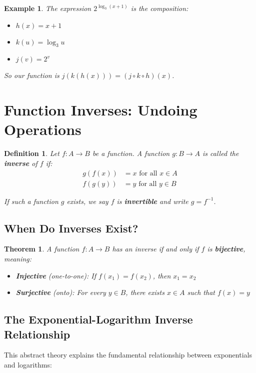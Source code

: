 \documentclass[12pt]{article}
\newtheorem{definition}{Definition}
\newtheorem{theorem}{Theorem}
\newtheorem{example}{Example}
\begin{document}
\begin{example}
The expression $2^{\log_3(x+1)}$ is the composition:
\begin{itemize}
\item $h(x) = x + 1$
\item $k(u) = \log_3 u$  
\item $j(v) = 2^v$
\end{itemize}

So our function is $j(k(h(x))) = (j \circ k \circ h)(x)$.
\end{example}

\section{Function Inverses: Undoing Operations}

\begin{definition}
Let $f: A \to B$ be a function. A function $g: B \to A$ is called the \textbf{inverse} of $f$ if:
\begin{align}
g(f(x)) &= x \text{ for all } x \in A \\
f(g(y)) &= y \text{ for all } y \in B
\end{align}

If such a function $g$ exists, we say $f$ is \textbf{invertible} and write $g = f^{-1}$.
\end{definition}

\subsection{When Do Inverses Exist?}

\begin{theorem}
A function $f: A \to B$ has an inverse if and only if $f$ is \textbf{bijective}, meaning:
\begin{itemize}
\item \textbf{Injective} (one-to-one): If $f(x_1) = f(x_2)$, then $x_1 = x_2$
\item \textbf{Surjective} (onto): For every $y \in B$, there exists $x \in A$ such that $f(x) = y$
\end{itemize}
\end{theorem}

\subsection{The Exponential-Logarithm Inverse Relationship}

This abstract theory explains the fundamental relationship between exponentials and logarithms:
\end{document}
